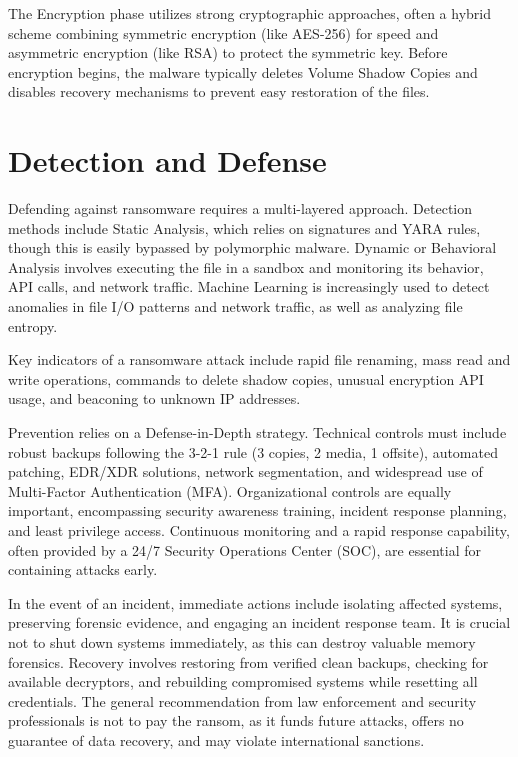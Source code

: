\documentclass[12pt,a4paper]{article}
\begin{document}
The Encryption phase utilizes strong cryptographic approaches, often a hybrid scheme combining symmetric encryption (like AES-256) for speed and asymmetric encryption (like RSA) to protect the symmetric key. Before encryption begins, the malware typically deletes Volume Shadow Copies and disables recovery mechanisms to prevent easy restoration of the files.

\section{Detection and Defense}
Defending against ransomware requires a multi-layered approach. Detection methods include Static Analysis, which relies on signatures and YARA rules, though this is easily bypassed by polymorphic malware. Dynamic or Behavioral Analysis involves executing the file in a sandbox and monitoring its behavior, API calls, and network traffic. Machine Learning is increasingly used to detect anomalies in file I/O patterns and network traffic, as well as analyzing file entropy.

Key indicators of a ransomware attack include rapid file renaming, mass read and write operations, commands to delete shadow copies, unusual encryption API usage, and beaconing to unknown IP addresses.

Prevention relies on a Defense-in-Depth strategy. Technical controls must include robust backups following the 3-2-1 rule (3 copies, 2 media, 1 offsite), automated patching, EDR/XDR solutions, network segmentation, and widespread use of Multi-Factor Authentication (MFA). Organizational controls are equally important, encompassing security awareness training, incident response planning, and least privilege access. Continuous monitoring and a rapid response capability, often provided by a 24/7 Security Operations Center (SOC), are essential for containing attacks early.

In the event of an incident, immediate actions include isolating affected systems, preserving forensic evidence, and engaging an incident response team. It is crucial not to shut down systems immediately, as this can destroy valuable memory forensics. Recovery involves restoring from verified clean backups, checking for available decryptors, and rebuilding compromised systems while resetting all credentials. The general recommendation from law enforcement and security professionals is not to pay the ransom, as it funds future attacks, offers no guarantee of data recovery, and may violate international sanctions.
\end{document}
